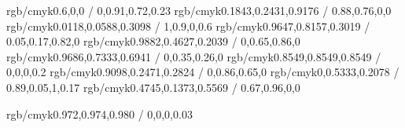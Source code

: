 \newcommand{\targetcolourmodel}{cmyk} %
\selectcolormodel{\targetcolourmodel}

\definecolor{dtured}    {rgb/cmyk}{0.6,0,0 / 0,0.91,0.72,0.23}
\definecolor{blue}      {rgb/cmyk}{0.1843,0.2431,0.9176 / 0.88,0.76,0,0}
\definecolor{navyblue}  {rgb/cmyk}{0.0118,0.0588,0.3098 / 1,0.9,0,0.6}
\definecolor{yellow}    {rgb/cmyk}{0.9647,0.8157,0.3019 / 0.05,0.17,0.82,0}
\definecolor{orange}    {rgb/cmyk}{0.9882,0.4627,0.2039 / 0,0.65,0.86,0}
\definecolor{pink}      {rgb/cmyk}{0.9686,0.7333,0.6941 / 0,0.35,0.26,0}
\definecolor{grey}      {rgb/cmyk}{0.8549,0.8549,0.8549 / 0,0,0,0.2}
\definecolor{red}       {rgb/cmyk}{0.9098,0.2471,0.2824 / 0,0.86,0.65,0}
\definecolor{green}     {rgb/cmyk}{0,0.5333,0.2078 / 0.89,0.05,1,0.17}
\definecolor{purple}    {rgb/cmyk}{0.4745,0.1373,0.5569 / 0.67,0.96,0,0}

\definecolor{codebg}   {rgb/cmyk}{0.972,0.974,0.980 / 0,0,0,0.03}

\newcommand{\dtulogocolour}{white} %
\newcommand{\frontpagetextcolour}{white} %



